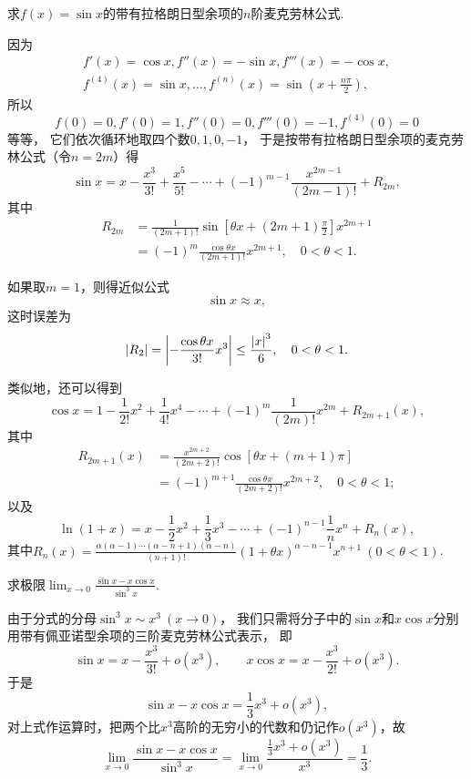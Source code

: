 \begin{example}
求\(f(x)=\sin x\)的带有拉格朗日型余项的\(n\)阶麦克劳林公式.
\begin{solution}
因为\[
	\begin{split}
		f'(x)=\cos x,
		f''(x)=-\sin x,
		f'''(x)=-\cos x, \\
		f^{(4)}(x)=\sin x,
		\dotsc,
		f^{(n)}(x)=\sin\left(x+\frac{n\pi}{2}\right),
	\end{split}
\]
所以\[
	f(0)=0,f'(0)=1,f''(0)=0,f'''(0)=-1,f^{(4)}(0)=0
\]等等，
它们依次循环地取四个数\(0,1,0,-1\)，
于是按带有拉格朗日型余项的麦克劳林公式（令\(n=2m\)）得\[
	\sin x = x - \frac{x^3}{3!} + \frac{x^5}{5!} - \dotsb + (-1)^{m-1} \frac{x^{2m-1}}{(2m-1)!} + R_{2m},
\]
其中\[
	\begin{split}
		R_{2m}
		&= \frac{1}{(2m+1)!} \sin\left[\theta x + (2m+1)\frac{\pi}{2}\right] x^{2m+1} \\
		&= (-1)^m \frac{\cos \theta x}{(2m+1)!} x^{2m+1},
		\quad 0<\theta<1.
	\end{split}
\]

如果取\(m=1\)，则得近似公式\[
	\sin x \approx x,
\]
这时误差为\[
	\abs{R_2} = \abs{-\frac{\cos \theta x}{3!} x^3}
	\leq \frac{\abs{x}^3}{6},
	\quad 0<\theta<1.
\]
\end{solution}
\end{example}

类似地，还可以得到\[
	\cos x
	= 1 - \frac{1}{2!} x^2
		+ \frac{1}{4!} x^4 - \dotsb
		+ (-1)^m \frac{1}{(2m)!} x^{2m}
		+ R_{2m+1}(x),
\]
其中\[
	\begin{split}
		R_{2m+1}(x)
		&= \frac{x^{2m+2}}{(2m+2)!} \cos\left[\theta x + (m+1)\pi\right] \\
		&= (-1)^{m+1} \frac{\cos \theta x}{(2m+2)!} x^{2m+2},
		\quad 0<\theta<1;
	\end{split}
\]
以及
\[
	\ln (1+x) = x - \frac{1}{2} x^2 + \frac{1}{3} x^3 - \dotsb
		+ (-1)^{n-1} \frac{1}{n} x^n + R_n(x),
\]
其中\(R_n(x) = \frac{\alpha(\alpha-1)\dotsm(\alpha-n+1)(\alpha-n)}{(n+1)!}
(1+\theta x)^{\alpha-n-1} x^{n+1}\ (0<\theta<1)\).

\begin{example}
求极限\(\lim_{x\to0}\frac{\sin x - x \cos x}{\sin^3 x}\).
\begin{solution}
由于分式的分母\(\sin^3 x \sim x^3\ (x\to0)\)，
我们只需将分子中的\(\sin x\)和\(x \cos x\)分别用带有佩亚诺型余项的三阶麦克劳林公式表示，
即\[
	\sin x = x - \frac{x^3}{3!} + o(x^3),
	\qquad
	x \cos x = x - \frac{x^3}{2!} + o(x^3).
\]
于是\[
	\sin x - x \cos x = \frac{1}{3} x^3 + o(x^3),
\]
对上式作运算时，把两个比\(x^3\)高阶的无穷小的代数和仍记作\(o(x^3)\)，故\[
	\lim_{x\to0}\frac{\sin x - x \cos x}{\sin^3 x}
	= \lim_{x\to0}\frac{\frac{1}{3} x^3 + o(x^3)}{x^3} = \frac{1}{3}.
\]
\end{solution}
\end{example}

